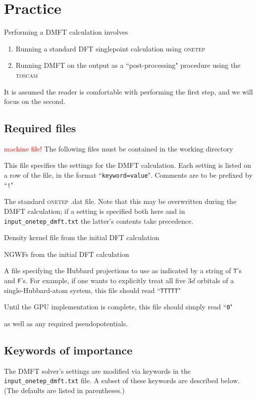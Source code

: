 \documentclass[10pt,a4paper,final]{article}
\begin{document}
\FloatBarrier
\section{Practice}
Performing a DMFT calculation involves
\begin{enumerate}
\item Running a standard DFT singlepoint calculation using \textsc{onetep}
\item Running DMFT on the output as a ``post-processing" procedure using the \textsc{toscam}
\end{enumerate}
It is assumed the reader is comfortable with performing the first step, and we will focus on the second.

\subsection{Required files}
\textcolor{red}{machine file!}
The following files must be contained in the working directory
\begin{description}[labelindent=\parindent, leftmargin=5cm, font={\ttfamily\bfseries}, style=sameline]
\item[input\_onetep\_dmft.txt] This file specifies the settings for the DMFT calculation. Each setting is listed on a row of the file, in the format ``\texttt{keyword=value}". Comments are to be prefixed by ``\texttt{!}"
\item[$\langle$seed$\rangle$.dat] The standard \textsc{onetep} .dat file. Note that this may be overwritten during the DMFT calculation; if a setting is specified both here and in \texttt{input\_onetep\_dmft.txt} the latter's contents take precedence. 
\item[$\langle$seed$\rangle$.dkn] Density kernel file from the initial DFT calculation
\item[$\langle$seed$\rangle$.tightbox\_ngwfs] NGWFs from the initial DFT calculation
\item[mask\_projections] A file specifying the Hubbard projections to use as indicated by a string of \texttt{T}'s and \texttt{F}'s. For example, if one  wants to explicitly treat all five $3d$ orbitals of a single-Hubbard-atom system, this file should read ``\texttt{TTTTT}"
\item[gpu\_max] Until the GPU implementation is complete, this file should simply read ``\texttt{0}"
\end{description}
as well as any required pseudopotentials.

\subsection{Keywords of importance}
The DMFT solver's settings are modified via keywords in the \texttt{input\_onetep\_dmft.txt} file. A subset of these keywords are described below. (The defaults are listed in parentheses.)
\end{document}
